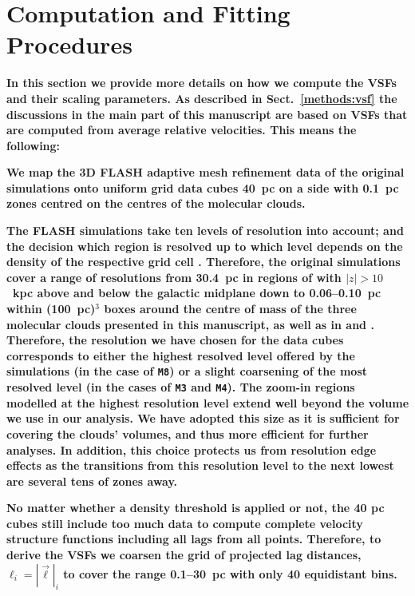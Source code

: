 \section{Computation and Fitting Procedures}\label{appFitting}

\textbf{
    In this section we provide more details on how we compute the VSFs and their scaling parameters.
    As described in Sect.~\ref{methods:vsf} the discussions in the main part of this manuscript are based on VSFs that are computed from average relative velocities. 
    This means the following:
}

\textbf{ 
    We map the 3D FLASH adaptive mesh refinement data of the original simulations  onto uniform grid data cubes 40~pc on a side with 0.1~pc zones centred on the centres of the molecular clouds. 
}

\textbf{
    The FLASH simulations take ten levels of resolution into account; and the decision which region is resolved up to which level depends on the density of the respective grid cell .
    Therefore, the original simulations cover a range of resolutions from 30.4~pc in regions of with $|z| > 10$~kpc above and below the galactic midplane down to 0.06--0.10~pc within (100~pc)$^3$ boxes around the centre of mass of the three molecular clouds presented in this manuscript, as well as in  and . 
    Therefore, the resolution we have chosen for the data cubes corresponds to either the highest resolved level offered by the simulations (in the case of \texttt{M8}) or a slight coarsening of the most resolved level (in the cases of \texttt{M3} and \texttt{M4}).
    The zoom-in regions modelled at the highest resolution level extend well beyond the volume we use in our analysis.
    We have adopted this size as it is sufficient for covering the clouds' volumes, and thus more efficient for further analyses. In addition, this choice protects us from resolution edge effects as the transitions from this resolution level to the next lowest are several tens of zones away. 
}

\textbf{
No matter whether a density threshold is applied or not, the 40 pc cubes still include too much data to compute complete velocity structure functions including all lags from all points.
Therefore, to derive the VSFs we coarsen the grid of projected lag distances, $\ell_i = |\vec{\ell}|_i$ to cover the range 0.1--30~pc with
only 40 equidistant bins. 
}

